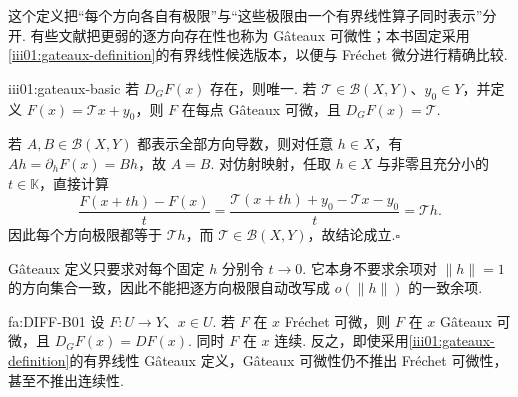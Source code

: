 这个定义把“每个方向各自有极限”与“这些极限由一个有界线性算子同时表示”分开. 有些文献把更弱的逐方向存在性也称为 Gâteaux 可微性；本书固定采用\autoref{iii01:gateaux-definition}的有界线性候选版本，以便与 Fréchet 微分进行精确比较.

\begin{FAProposition}{iii01:gateaux-basic}
若 \(\displaystyle D_GF(x)\) 存在，则唯一. 若 \(\displaystyle\mathcal T\in\mathcal B(X,Y)\)、\(\displaystyle y_0\in Y\)，并定义 \(\displaystyle F(x)=\mathcal Tx+y_0\)，则 \(\displaystyle F\) 在每点 Gâteaux 可微，且 \(\displaystyle D_GF(x)=\mathcal T\).
\end{FAProposition}

\begin{FAProof}
若 \(\displaystyle A,B\in\mathcal B(X,Y)\) 都表示全部方向导数，则对任意 \(\displaystyle h\in X\)，有 \(\displaystyle Ah=\partial_hF(x)=Bh\)，故 \(\displaystyle A=B\). 对仿射映射，任取 \(\displaystyle h\in X\) 与非零且充分小的 \(\displaystyle t\in\mathbb K\)，直接计算
\[
\frac{F(x+th)-F(x)}{t}
=
\frac{\mathcal T(x+th)+y_0-\mathcal Tx-y_0}{t}
=
\mathcal Th.
\]
因此每个方向极限都等于 \(\displaystyle\mathcal Th\)，而 \(\displaystyle\mathcal T\in\mathcal B(X,Y)\)，故结论成立.\hfill\(\square\)
\end{FAProof}

Gâteaux 定义只要求对每个固定 \(\displaystyle h\) 分别令 \(\displaystyle t\to0\). 它本身不要求余项对 \(\displaystyle\|h\|=1\) 的方向集合一致，因此不能把逐方向极限自动改写成 \(\displaystyle o(\|h\|)\) 的一致余项.

\begin{FATheorem}{fa:DIFF-B01}
设 \(\displaystyle F:U\to Y\)、\(\displaystyle x\in U\). 若 \(\displaystyle F\) 在 \(\displaystyle x\) Fréchet 可微，则 \(\displaystyle F\) 在 \(\displaystyle x\) Gâteaux 可微，且
\(\displaystyle D_GF(x)=DF(x).\)
同时 \(\displaystyle F\) 在 \(\displaystyle x\) 连续. 反之，即使采用\autoref{iii01:gateaux-definition}的有界线性 Gâteaux 定义，Gâteaux 可微性仍不推出 Fréchet 可微性，甚至不推出连续性.
\end{FATheorem}

